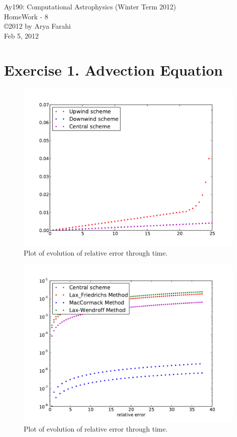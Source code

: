 \documentclass[10pt]{article}
\begin{document}
\begin{center}
{\large Ay190: Computational Astrophysics (Winter Term 2012)} \\
{\large HomeWork - 8 } \\
\copyright 2012 by Arya Farahi \\
Feb 5, 2012
\end{center}

\section{Exercise 1.  Advection Equation}

\begin{figure}[hbt]
 \begin{center}
  \includegraphics[scale=0.3]{Plots/plot1.pdf}
  \caption{\label{fig:a1} Plot of evolution of relative error through time.}
 \end{center}
\end{figure}

\begin{figure}[hbt]
 \begin{center}
  \includegraphics[scale=0.3]{Plots/plot5.pdf}
  \caption{\label{fig:a2} Plot of evolution of relative error through time.}
 \end{center}
\end{figure}
\end{document}
